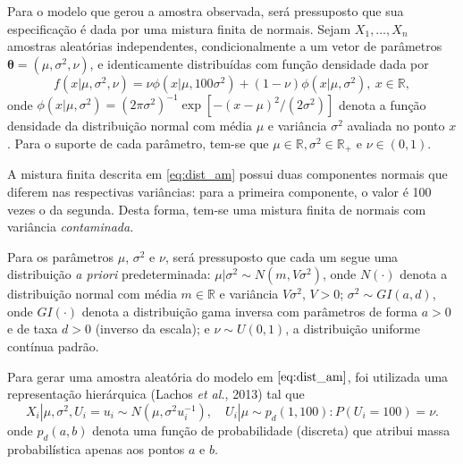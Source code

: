 \documentclass[12pt,reqno,a4paper,oneside]{article}
\begin{document}
Para o modelo que gerou a amostra observada, será pressuposto que sua especificação é dada por uma mistura finita de normais. Sejam $X_{1}, \ldots, X_{n}$ amostras aleatórias independentes, condicionalmente a um vetor de parâmetros $\bm{\theta} = (\mu, \sigma^2, \nu)$, e identicamente distribuídas com função densidade dada por
\begin{equation}\label{eq:dist_am}
f(x | \mu, \sigma^2, \nu) = \nu \phi(x | \mu, 100 \sigma^2) + (1 - \nu) \phi(x | \mu, \sigma^2), \ x \in \mathbb{R},
\end{equation}
\noindent onde $\phi(x | \mu, \sigma^2) = (2\pi\sigma^2)^{-1} \exp[-(x - \mu)^2/(2\sigma^2)]$ denota a função densidade da distribuição normal com média $\mu$ e variância $\sigma^2$ avaliada no ponto $x$. Para o suporte de cada parâmetro, tem-se que $\mu \in \mathbb{R}, \sigma^2 \in \mathbb{R}_+$ e $\nu \in (0,1)$.

A mistura finita descrita em \eqref{eq:dist_am} possui duas componentes normais que diferem nas respectivas variâncias: para a primeira componente, o valor é 100 vezes o da segunda. Desta forma, tem-se uma mistura finita de normais com variância \textit{contaminada}.

Para os parâmetros $\mu$, $\sigma^2$ e $\nu$, será pressuposto que cada um segue uma distribuição \textit{a priori} predeterminada: $\mu | \sigma^2 \sim{N} (m, V \sigma^2)$, onde $N(\cdot)$ denota a distribuição normal com média $m \in \mathbb{R}$ e variância $V \sigma^2$, $V > 0$; $\sigma^2 \sim{GI} (a,d)$, onde $GI(\cdot)$ denota a distribuição gama inversa com parâmetros de forma $a > 0$ e de taxa $d > 0$ (inverso da escala); e $\nu \sim{U}(0,1)$, a distribuição uniforme contínua padrão.

Para gerar uma amostra aleatória do modelo em $\eqref{eq:dist_am}$, foi utilizada uma representação hierárquica (Lachos \textit{et al.}, 2013)\cite{Lachos2013} tal que
\begin{equation}
X_i | \mu, \sigma^2, U_{i} = u_i \sim{N}(\mu, \sigma^2 u_i^{-1}), \quad U_i | \mu \sim{p_d}(1,100) : P(U_i = 100) = \nu. \label{eq:hier}
\end{equation}
\noindent onde $p_d(a,b)$ denota uma função de probabilidade (discreta) que atribui massa probabilística apenas aos pontos $a$ e $b$.
\end{document}
